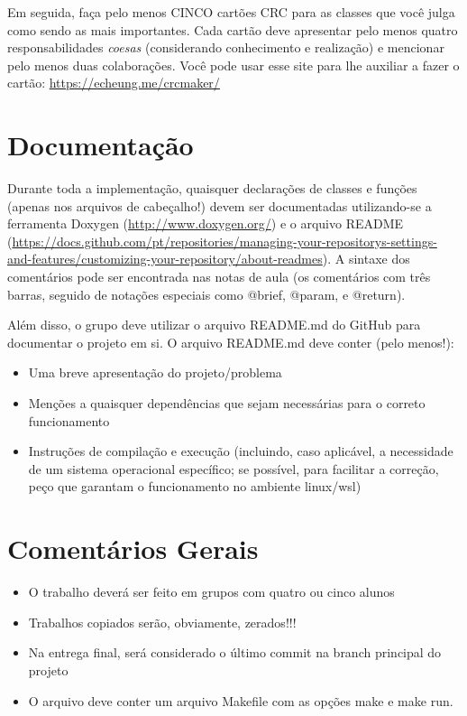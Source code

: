 \documentclass[11pt]{article}
\begin{document}
Em seguida, faça pelo menos CINCO cartões CRC para as classes que você
julga como sendo as mais importantes. Cada cartão deve
apresentar pelo menos quatro responsabilidades \emph{coesas} (considerando
conhecimento e realização) e mencionar pelo menos duas
colaborações. Você pode usar esse site para lhe auxiliar a fazer o
cartão: \url{https://echeung.me/crcmaker/}
\section{Documentação}
\label{sec:orga328f33}

Durante toda a implementação, quaisquer declarações de
classes e funções (apenas nos arquivos de cabeçalho!) devem ser
documentadas utilizando-se a ferramenta Doxygen
(\url{http://www.doxygen.org/}) e o arquivo README
(\url{https://docs.github.com/pt/repositories/managing-your-repositorys-settings-and-features/customizing-your-repository/about-readmes}).
A sintaxe dos comentários pode ser encontrada nas notas de aula (os
comentários com três barras, seguido de notações especiais como
@brief, @param, e @return).

Além disso, o grupo deve utilizar o arquivo README.md do GitHub para
documentar o projeto em si. O arquivo README.md deve conter (pelo
menos!):

\begin{itemize}
\item Uma breve apresentação do projeto/problema
\item Menções a quaisquer dependências que sejam necessárias para
o correto funcionamento
\item Instruções de compilação e execução (incluindo, caso aplicável, a
necessidade de um sistema operacional específico; se possível, para
facilitar a correção, peço que garantam o funcionamento no ambiente
linux/wsl)
\end{itemize}
\section{Comentários Gerais}
\label{sec:org1370881}

\begin{itemize}
\item O trabalho deverá ser feito em grupos com quatro ou cinco alunos
\item Trabalhos copiados serão, obviamente, zerados!!!
\item Na entrega final, será considerado o último commit na branch principal do projeto
\item O arquivo deve conter um arquivo Makefile com as opções make e make run.
\end{itemize}
\end{document}
